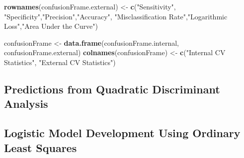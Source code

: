 \documentclass[american,]{article}
\newenvironment{Shaded}{\begin{snugshade}}{\end{snugshade}}
\newcommand{\CommentTok}[1]{\textcolor[rgb]{0.56,0.35,0.01}{\textit{#1}}}
\newcommand{\DataTypeTok}[1]{\textcolor[rgb]{0.13,0.29,0.53}{#1}}
\newcommand{\KeywordTok}[1]{\textcolor[rgb]{0.13,0.29,0.53}{\textbf{#1}}}
\newcommand{\NormalTok}[1]{#1}
\newcommand{\OperatorTok}[1]{\textcolor[rgb]{0.81,0.36,0.00}{\textbf{#1}}}
\newcommand{\StringTok}[1]{\textcolor[rgb]{0.31,0.60,0.02}{#1}}
\begin{document}
\begin{Shaded}
\begin{Highlighting}[]
\KeywordTok{rownames}\NormalTok{(confusionFrame.external) <-}\StringTok{ }\KeywordTok{c}\NormalTok{(}\StringTok{"Sensitivity"}\NormalTok{,}
\StringTok{"Specificity"}\NormalTok{,}\StringTok{"Precision"}\NormalTok{,}\StringTok{"Accuracy"}\NormalTok{,}
\StringTok{"Misclassification Rate"}\NormalTok{,}\StringTok{"Logarithmic Loss"}\NormalTok{,}\StringTok{"Area Under the Curve"}\NormalTok{)}

\NormalTok{confusionFrame <-}\StringTok{ }\KeywordTok{data.frame}\NormalTok{(confusionFrame.internal, confusionFrame.external)}
\KeywordTok{colnames}\NormalTok{(confusionFrame) <-}\StringTok{ }\KeywordTok{c}\NormalTok{(}\StringTok{"Internal CV Statistics"}\NormalTok{, }
\StringTok{"External CV Statistics"}\NormalTok{)}
\end{Highlighting}
\end{Shaded}

\hypertarget{predictions-from-quadratic-discriminant-analysis}{%
\subsection{Predictions from Quadratic Discriminant Analysis}\label{predictions-from-quadratic-discriminant-analysis}}

\begin{Shaded}
\end{Shaded}

\hypertarget{logistic-model-development-using-ordinary-least-squares-1}{%
\subsection{Logistic Model Development Using Ordinary Least Squares}\label{logistic-model-development-using-ordinary-least-squares-1}}
\end{document}
